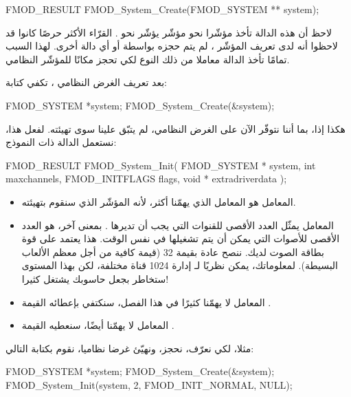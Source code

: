 \begin{Csource}
FMOD_RESULT FMOD_System_Create(FMOD_SYSTEM ** system);
\end{Csource}

لاحظ أن هذه الدالة تأخذ مؤشّرا نحو مؤشّر يؤشّر نحو
.
القرّاء الأكثر حرصًا كانوا قد لاحظوا أنه لدى تعريف المؤشّر
،
لم يتم حجزه بواسطة
أو أي دالة أخرى. لهذا السبب تمامًا تأخذ الدالة
معاملا من ذلك النوع لكي تحجز مكانًا للمؤشّر النظامي.

بعد تعريف الغرض النظامي ، تكفي كتابة:

\begin{Csource}
FMOD_SYSTEM *system;
FMOD_System_Create(&system);
\end{Csource}

هكذا إذا، بما أننا نتوفّر الآن على الغرض النظامي، لم يتبّق علينا سوى تهيئته. لفعل هذا، نستعمل الدالة
ذات النموذج:
\begin{Csource}
FMOD_RESULT FMOD_System_Init(
	FMOD_SYSTEM *  system,
	int  maxchannels,
	FMOD_INITFLAGS  flags,
	void *  extradriverdata
);
\end{Csource}

\begin{itemize}
	\item المعامل
	هو المعامل الذي يهمّنا أكثر، لأنه المؤشّر الذي سنقوم بتهيئته.
	\item المعامل
	يمثّل العدد الأقصى للقنوات التي يجب أن تديرها
	.
	بمعنى آخر، هو العدد الأقصى للأصوات التي يمكن أن يتم تشغيلها في نفس الوقت. هذا يعتمد على قوة بطاقة الصوت لديك. ننصح عادة بقيمة 32 (قيمة كافية من أجل معظم الألعاب البسيطة). لمعلوماتك، يمكن نظريًا لـ
	إدارة 1024 قناة مختلفة، لكن بهذا المستوى ستخاطر بجعل حاسوبك يشتغل كثيرا!
	\item المعامل
	لا يهمّنا كثيرًا في هذا الفصل، سنكتفي بإعطائه القيمة
	.
	\item المعامل
	لا يهمّنا أيضًا، سنعطيه القيمة
	.
\end{itemize}

مثلا، لكي نعرّف، نحجز، ونهيّئ غرضا نظاميا،  نقوم بكتابة التالي:

\begin{Csource}
FMOD_SYSTEM *system;
FMOD_System_Create(&system);
FMOD_System_Init(system, 2, FMOD_INIT_NORMAL, NULL);
\end{Csource}


